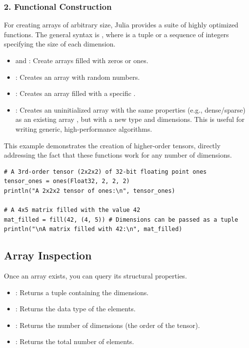 \subsubsection*{2. Functional Construction}
For creating arrays of arbitrary size, Julia provides a suite of highly optimized functions. The general syntax is , where  is a tuple or a sequence of integers specifying the size of each dimension.
\begin{itemize}
    \item {} and : Create arrays filled with zeros or ones.
    \item {}: Creates an array with random numbers.
    \item {}: Creates an array filled with a specific .
    \item {}: Creates an uninitialized array with the same properties (e.g., dense/sparse) as an existing array , but with a new type and dimensions. This is useful for writing generic, high-performance algorithms.
\end{itemize}

\begin{example}
This example demonstrates the creation of higher-order tensors, directly addressing the fact that these functions work for any number of dimensions.
\begin{verbatim}
# A 3rd-order tensor (2x2x2) of 32-bit floating point ones
tensor_ones = ones(Float32, 2, 2, 2)
println("A 2x2x2 tensor of ones:\n", tensor_ones)

# A 4x5 matrix filled with the value 42
mat_filled = fill(42, (4, 5)) # Dimensions can be passed as a tuple
println("\nA matrix filled with 42:\n", mat_filled)
\end{verbatim}
\end{example}

\subsection*{Array Inspection}
Once an array exists, you can query its structural properties.
\begin{itemize}
    \item \textbf{}: Returns a tuple containing the dimensions.
    \item \textbf{}: Returns the data type of the elements.
    \item \textbf{}: Returns the number of dimensions (the order of the tensor).
    \item \textbf{}: Returns the total number of elements.
\end{itemize}

